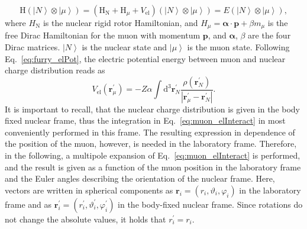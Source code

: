 \begin{equation}
\text{H} \left(\left|N\right>\otimes \left|\mu\right>\right)= \left(\text{H}_{\text{N}} + \text{H}_\mu + V_{\text{el}}\right) \left(\left|N\right>\otimes \left|\mu\right>\right)= E \left(\left|N\right>\otimes \left|\mu\right>\right),
\label{eq:muon_htotal}
\end{equation}
where $H_{\text{N}}$ is the nuclear rigid rotor Hamiltonian, and ${H_\mu}{=}{\boldsymbol{\alpha} \cdot \mathbf{p} + \beta m_\mu}$ is the free Dirac Hamiltonian for the muon with momentum $\mathbf{p}$, and $\boldsymbol{\alpha}$, $\beta$ are the four Dirac matrices. $\left|N\right>$ is the nuclear state and $\left|\mu\right>$ is the muon state. Following Eq.~\eqref{eq:furry_elPot}, the electric potential energy between muon and nuclear charge distribution reads as
\begin{equation}
\label{eq:muon_elInteract}
V_{\text{el}}(\mathbf{r}_\mu^\prime)=-Z\alpha \int \mathrm{d}^3\mathbf{r}_N^\prime \frac{\rho(\mathbf{r}_N^\prime)}{|\mathbf{r}_\mu^\prime-\mathbf{r}_N^\prime|}.
\end{equation}
It is important to recall, that the nuclear charge distribution is given in the body fixed nuclear frame, thus the integration in Eq.~\eqref{eq:muon_elInteract} in most conveniently performed in this frame. The resulting expression in dependence of the position of the muon, however, is needed in the laboratory frame. Therefore, in the following, a multipole expansion of Eq.~\eqref{eq:muon_elInteract} is performed, and the result is given as a function of the muon position in the laboratory frame and the Euler angles describing the orientation of the nuclear frame. Here, vectors are written in spherical components as $\mathbf{r}_i = (r_i,\vartheta_i,\varphi_i)$ in the laboratory frame and as $\mathbf{r}_i^\prime = (r_i^\prime,\vartheta_i^\prime,\varphi_i^\prime)$ in the body-fixed nuclear frame. Since rotations do not change the absolute values, it holds that $r_i^\prime = r_i$.

